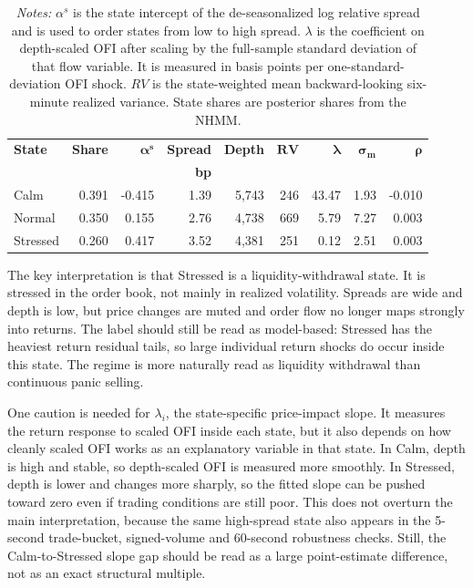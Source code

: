 \documentclass[12pt,a4paper]{article}
\begin{document}
\begin{table}[htbp]
\centering
\caption{Estimated liquidity-cost regimes}
\small
\begin{tabular}{lrrrrrrrr}
\toprule
\textbf{State} & \textbf{Share} & \(\boldsymbol{\alpha^s}\) & \textbf{Spread} & \textbf{Depth} & \(\boldsymbol{RV}\) & \(\boldsymbol{\lambda}\) & \(\boldsymbol{\sigma_m}\) & \(\boldsymbol{\rho}\) \\
 &  &  & \textbf{bp} &  &  &  &  &  \\
\midrule
Calm & 0.391 & -0.415 & 1.39 & 5,743 & 246 & 43.47 & 1.93 & -0.010 \\
Normal & 0.350 & 0.155 & 2.76 & 4,738 & 669 & 5.79 & 7.27 & 0.003 \\
Stressed & 0.260 & 0.417 & 3.52 & 4,381 & 251 & 0.12 & 2.51 & 0.003 \\
\bottomrule
\end{tabular}
\caption*{\footnotesize\emph{Notes:} \(\alpha^s\) is the state intercept of the de-seasonalized log relative spread and is used to order states from low to high spread. \(\lambda\) is the coefficient on depth-scaled OFI after scaling by the full-sample standard deviation of that flow variable. It is measured in basis points per one-standard-deviation OFI shock. \(RV\) is the state-weighted mean backward-looking six-minute realized variance. State shares are posterior shares from the NHMM.}
\label{tab:states}
\end{table}

The key interpretation is that Stressed is a liquidity-withdrawal state. It is stressed in the order book, not mainly in realized volatility. Spreads are wide and depth is low, but price changes are muted and order flow no longer maps strongly into returns. The label should still be read as model-based: Stressed has the heaviest return residual tails, so large individual return shocks do occur inside this state. The regime is more naturally read as liquidity withdrawal than continuous panic selling.

One caution is needed for \(\lambda_i\), the state-specific price-impact slope. It measures the return response to scaled OFI inside each state, but it also depends on how cleanly scaled OFI works as an explanatory variable in that state. In Calm, depth is high and stable, so depth-scaled OFI is measured more smoothly. In Stressed, depth is lower and changes more sharply, so the fitted slope can be pushed toward zero even if trading conditions are still poor. This does not overturn the main interpretation, because the same high-spread state also appears in the 5-second trade-bucket, signed-volume  and 60-second robustness checks. Still, the Calm-to-Stressed slope gap should be read as a large point-estimate difference, not as an exact structural multiple.
\end{document}

